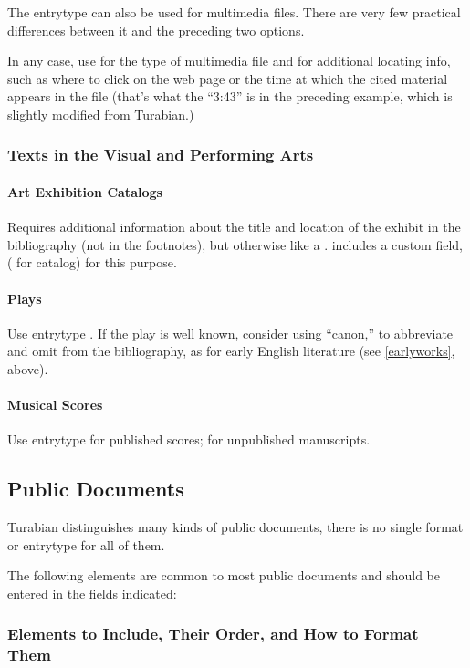 \documentclass{ltxdockit}[2010/02/12]
\begin{document}
{The entrytype  can also be used for multimedia files. There are very few practical differences between it and the preceding two options.

In any case, use  for the type of multimedia file and  for additional locating info, such as where to click on the web page or the time at which the cited material appears in the file (that's what the ``3:43'' is in the preceding example, which is slightly modified from Turabian.)


\subsubsection{Texts in the Visual and Performing Arts}
\paragraph{Art Exhibition Catalogs}
Requires additional information about the title and location of the exhibit in the bibliography (not in the footnotes), but otherwise like a .  includes a custom field,  ( for catalog) for this purpose.\autocites[][]{1998weltratsel-und}

\paragraph{Plays}
Use entrytype . If the play is well known, consider using  ``canon,'' to abbreviate and omit from the bibliography, as for early English literature (see \ref{earlyworks}, above).

\paragraph{Musical Scores}
Use entrytype  for published scores;   for unpublished manuscripts.

\subsection{Public Documents}

Turabian distinguishes many kinds of public documents, there is no single format or entrytype for all of them.


The following elements are common to most public documents and should be entered in the fields indicated:

\subsubsection{Elements to Include, Their Order, and How to Format Them}

}
\end{document}
